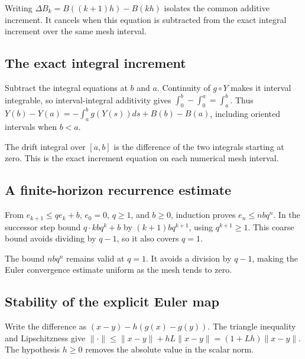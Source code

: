 \documentclass[11pt,a4paper]{report}
\begin{document}
Writing \(\Delta B_k=B((k+1)h)-B(kh)\) isolates the common additive increment. It cancels when this equation is subtracted from the exact integral increment over the same mesh interval.

\subsection{\texorpdfstring{The exact integral increment}{The exact integral increment}}
\label{report-step-UnadjustedLangevin-EulerLimit-lean-4}


Subtract the integral equations at \(b\) and \(a\). Continuity of \(g\circ Y\) makes it interval integrable, so interval-integral additivity gives \(\int_0^b-\int_0^a=\int_a^b\). Thus \(Y(b)-Y(a)=-\int_a^b g(Y(s))ds+B(b)-B(a)\), including oriented intervals when \(b<a\).



The drift integral over \([a,b]\) is the difference of the two integrals starting at zero. This is the exact increment equation on each numerical mesh interval.

\subsection{\texorpdfstring{A finite-horizon recurrence estimate}{A finite-horizon recurrence estimate}}
\label{report-step-UnadjustedLangevin-EulerLimit-lean-5}


From \(e_{k+1}\le qe_k+b\), \(e_0=0\), \(q\ge1\), and \(b\ge0\), induction proves \(e_n\le nbq^n\). In the successor step bound \(q\cdot kbq^k+b\) by \((k+1)bq^{k+1}\), using \(q^{k+1}\ge1\). This coarse bound avoids dividing by \(q-1\), so it also covers \(q=1\).



The bound \(nbq^n\) remains valid at \(q=1\). It avoids a division by \(q-1\), making the Euler convergence estimate uniform as the mesh tends to zero.

\subsection{\texorpdfstring{Stability of the explicit Euler map}{Stability of the explicit Euler map}}
\label{report-step-UnadjustedLangevin-EulerLimit-lean-6}


Write the difference as \((x-y)-h(g(x)-g(y))\). The triangle inequality and Lipschitzness give \(\|\cdot\|\le\|x-y\|+hL\|x-y\|=(1+Lh)\|x-y\|\). The hypothesis \(h\ge0\) removes the absolute value in the scalar norm.
\end{document}
